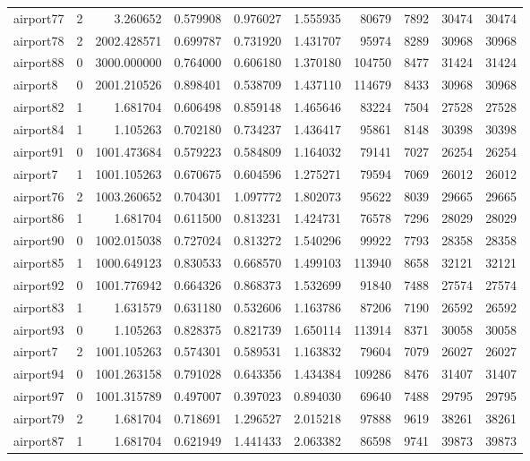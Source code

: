 \begin{longtable}{|l|r|r|r|r|r|r|r|r|r|}
airport77 & 2 & 3.260652 & 0.579908 & 0.976027 & 1.555935 & 80679 & 7892 & 30474 & 30474 \\
airport78 & 2 & 2002.428571 & 0.699787 & 0.731920 & 1.431707 & 95974 & 8289 & 30968 & 30968 \\
airport88 & 0 & 3000.000000 & 0.764000 & 0.606180 & 1.370180 & 104750 & 8477 & 31424 & 31424 \\
airport8 & 0 & 2001.210526 & 0.898401 & 0.538709 & 1.437110 & 114679 & 8433 & 30968 & 30968 \\
airport82 & 1 & 1.681704 & 0.606498 & 0.859148 & 1.465646 & 83224 & 7504 & 27528 & 27528 \\
airport84 & 1 & 1.105263 & 0.702180 & 0.734237 & 1.436417 & 95861 & 8148 & 30398 & 30398 \\
airport91 & 0 & 1001.473684 & 0.579223 & 0.584809 & 1.164032 & 79141 & 7027 & 26254 & 26254 \\
airport7 & 1 & 1001.105263 & 0.670675 & 0.604596 & 1.275271 & 79594 & 7069 & 26012 & 26012 \\
airport76 & 2 & 1003.260652 & 0.704301 & 1.097772 & 1.802073 & 95622 & 8039 & 29665 & 29665 \\
airport86 & 1 & 1.681704 & 0.611500 & 0.813231 & 1.424731 & 76578 & 7296 & 28029 & 28029 \\
airport90 & 0 & 1002.015038 & 0.727024 & 0.813272 & 1.540296 & 99922 & 7793 & 28358 & 28358 \\
airport85 & 1 & 1000.649123 & 0.830533 & 0.668570 & 1.499103 & 113940 & 8658 & 32121 & 32121 \\
airport92 & 0 & 1001.776942 & 0.664326 & 0.868373 & 1.532699 & 91840 & 7488 & 27574 & 27574 \\
airport83 & 1 & 1.631579 & 0.631180 & 0.532606 & 1.163786 & 87206 & 7190 & 26592 & 26592 \\
airport93 & 0 & 1.105263 & 0.828375 & 0.821739 & 1.650114 & 113914 & 8371 & 30058 & 30058 \\
airport7 & 2 & 1001.105263 & 0.574301 & 0.589531 & 1.163832 & 79604 & 7079 & 26027 & 26027 \\
airport94 & 0 & 1001.263158 & 0.791028 & 0.643356 & 1.434384 & 109286 & 8476 & 31407 & 31407 \\
airport97 & 0 & 1001.315789 & 0.497007 & 0.397023 & 0.894030 & 69640 & 7488 & 29795 & 29795 \\
airport79 & 2 & 1.681704 & 0.718691 & 1.296527 & 2.015218 & 97888 & 9619 & 38261 & 38261 \\
airport87 & 1 & 1.681704 & 0.621949 & 1.441433 & 2.063382 & 86598 & 9741 & 39873 & 39873 \\

\end{longtable}
